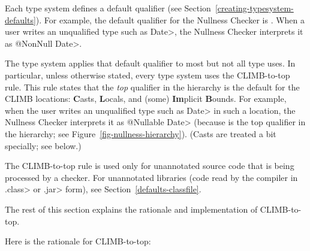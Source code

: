 
Each type system defines a default qualifier (see
Section~\ref{creating-typesystem-defaults}).  For example, the default
qualifier for the Nullness Checker is
.  When a user
writes an unqualified type such as \<Date>, the Nullness Checker interprets it as
\<@NonNull Date>.

The type system applies that default qualifier to most but
not all type uses.  In particular, unless otherwise stated, every type system
uses the CLIMB-to-top rule.  This
rule states that the \emph{top} qualifier in the hierarchy is the default for
the CLIMB locations:  \textbf{C}asts, \textbf{L}ocals,
and (some) \textbf{Im}plicit \textbf{B}ounds.
For example, when the user writes an unqualified type such as \<Date> in such a
location, the Nullness Checker interprets it as \<@Nullable Date> (because
 is the top qualifier in the
hierarchy; see Figure~\ref{fig-nullness-hierarchy}).
(Casts are treated a bit specially; see below.)


The CLIMB-to-top rule is used only for unannotated source code that is
being processed by a checker.  For unannotated libraries (code read by the
compiler in \<.class> or \<.jar> form), see Section~\ref{defaults-classfile}.

The rest of this section explains the rationale and implementation of
CLIMB-to-top.

Here is the rationale for CLIMB-to-top:

